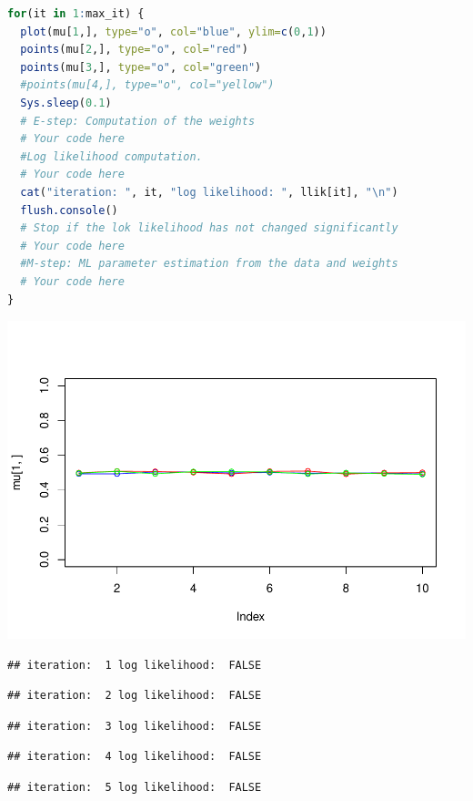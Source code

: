 \documentclass[
]{article}
\begin{document}
\begin{lstlisting}[language=R]
for(it in 1:max_it) {
  plot(mu[1,], type="o", col="blue", ylim=c(0,1))
  points(mu[2,], type="o", col="red")
  points(mu[3,], type="o", col="green")
  #points(mu[4,], type="o", col="yellow")
  Sys.sleep(0.1)
  # E-step: Computation of the weights
  # Your code here
  #Log likelihood computation.
  # Your code here
  cat("iteration: ", it, "log likelihood: ", llik[it], "\n")
  flush.console()
  # Stop if the lok likelihood has not changed significantly
  # Your code here
  #M-step: ML parameter estimation from the data and weights
  # Your code here
}
\end{lstlisting}

\includegraphics{Block2Lab1_files/figure-latex/2.1-2.pdf}

\begin{lstlisting}
## iteration:  1 log likelihood:  FALSE
\end{lstlisting}

\begin{lstlisting}
## iteration:  2 log likelihood:  FALSE
\end{lstlisting}

\begin{lstlisting}
## iteration:  3 log likelihood:  FALSE
\end{lstlisting}

\begin{lstlisting}
## iteration:  4 log likelihood:  FALSE
\end{lstlisting}

\begin{lstlisting}
## iteration:  5 log likelihood:  FALSE
\end{lstlisting}
\end{document}
